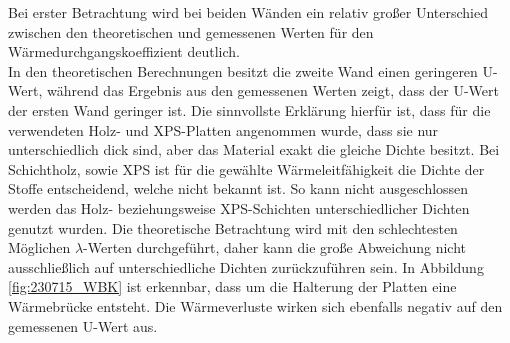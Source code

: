 Bei erster Betrachtung wird bei beiden Wänden ein relativ großer Unterschied zwischen den theoretischen und gemessenen Werten für den Wärmedurchgangskoeffizient deutlich.\\
In den theoretischen Berechnungen besitzt die zweite Wand einen geringeren U-Wert, während das Ergebnis aus den gemessenen Werten zeigt, dass der U-Wert der ersten Wand geringer ist.
Die sinnvollste Erklärung hierfür ist, dass für die verwendeten Holz- und XPS-Platten angenommen wurde, dass sie nur unterschiedlich dick sind, aber das Material exakt die gleiche Dichte besitzt.
Bei Schichtholz, sowie XPS ist für die gewählte Wärmeleitfähigkeit die Dichte der Stoffe entscheidend, welche nicht bekannt ist.
So kann nicht ausgeschlossen werden das Holz- beziehungsweise XPS-Schichten unterschiedlicher Dichten genutzt wurden.
Die theoretische Betrachtung wird mit den schlechtesten Möglichen $\lambda$-Werten durchgeführt, daher kann die große Abweichung nicht ausschließlich auf unterschiedliche Dichten zurückzuführen sein.
In Abbildung \ref{fig:230715_WBK} ist erkennbar, dass um die Halterung der Platten eine Wärmebrücke entsteht. Die Wärmeverluste wirken sich ebenfalls negativ auf den gemessenen U-Wert aus.
\\
